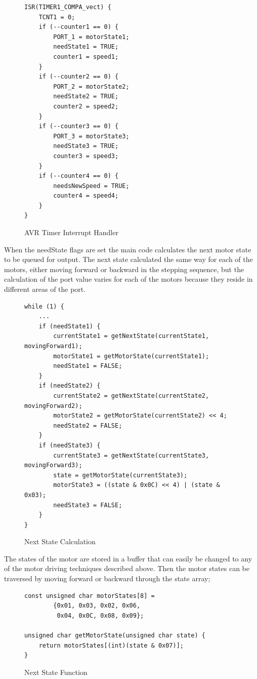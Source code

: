 \begin{figure}[H]
\begin{lstlisting}
ISR(TIMER1_COMPA_vect) {
    TCNT1 = 0;
    if (--counter1 == 0) {
        PORT_1 = motorState1;
        needState1 = TRUE;
        counter1 = speed1;
    }
    if (--counter2 == 0) {
        PORT_2 = motorState2;
        needState2 = TRUE;
        counter2 = speed2;
    }
    if (--counter3 == 0) {
        PORT_3 = motorState3;
        needState3 = TRUE;
        counter3 = speed3;
    }
    if (--counter4 == 0) {
        needsNewSpeed = TRUE;
        counter4 = speed4;
    }
}
\end{lstlisting}
\caption{AVR Timer Interrupt Handler}
\label{figure:interrupt}
\end{figure}

When the needState flags are set the main code calculates the next motor state to be queued for output.  The next state calculated the same way for each of the motors, either moving forward or backward in the stepping sequence, but the calculation of the port value varies for each of the motors because they reside in different areas of the port.

\begin{figure}[H]
\lstset{tabsize=4}
\begin{lstlisting}
while (1) {
	...
	if (needState1) {
		currentState1 = getNextState(currentState1, movingForward1);
		motorState1 = getMotorState(currentState1);
		needState1 = FALSE;
	}
	if (needState2) {
		currentState2 = getNextState(currentState2, movingForward2);
		motorState2 = getMotorState(currentState2) << 4;
		needState2 = FALSE;
	}
	if (needState3) {
		currentState3 = getNextState(currentState3, movingForward3);
		state = getMotorState(currentState3);
		motorState3 = ((state & 0x0C) << 4) | (state & 0x03);
		needState3 = FALSE;
	}
}
\end{lstlisting}
\caption{Next State Calculation}
\label{figure:next_state}
\end{figure}

The states of the motor are stored in a buffer that can easily be changed to any of the motor driving techniques described above.  Then the motor states can be traversed by moving forward or backward through the state array;

\begin{figure}[H]
\begin{lstlisting}
const unsigned char motorStates[8] = 
        {0x01, 0x03, 0x02, 0x06, 
         0x04, 0x0C, 0x08, 0x09};

unsigned char getMotorState(unsigned char state) {
    return motorStates[(int)(state & 0x07)];
}
\end{lstlisting}
\caption{Next State Function}
\label{figure:next_state_func}
\end{figure}

